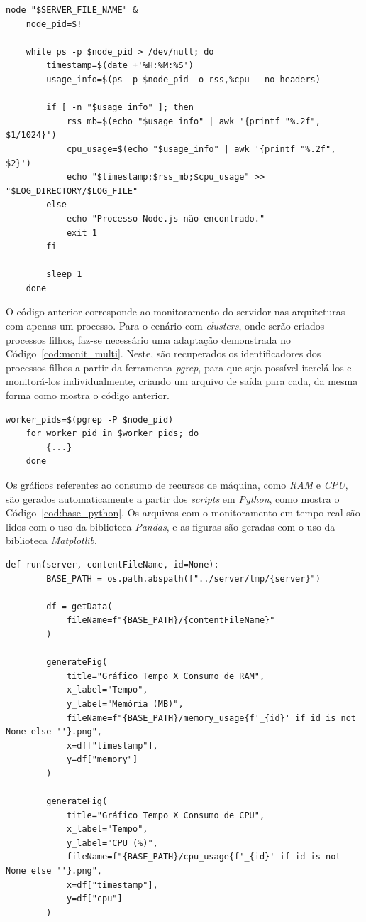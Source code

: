 \documentclass[12pt]{article}
\begin{document}
\begin{lstlisting}[caption={\textit{Script} para monitrar processos \textit{single thread}}, label=cod:monit_single]
	node "$SERVER_FILE_NAME" &
	node_pid=$!

	while ps -p $node_pid > /dev/null; do
		timestamp=$(date +'%H:%M:%S')
		usage_info=$(ps -p $node_pid -o rss,%cpu --no-headers)

		if [ -n "$usage_info" ]; then
			rss_mb=$(echo "$usage_info" | awk '{printf "%.2f", $1/1024}')
			cpu_usage=$(echo "$usage_info" | awk '{printf "%.2f", $2}')
			echo "$timestamp;$rss_mb;$cpu_usage" >> "$LOG_DIRECTORY/$LOG_FILE"
		else
			echo "Processo Node.js não encontrado."
			exit 1
		fi

		sleep 1
	done
\end{lstlisting}

O código anterior corresponde ao monitoramento do servidor nas arquiteturas com apenas um processo. Para o cenário
com \textit{clusters}, onde serão criados processos filhos, faz-se necessário uma adaptação 
demonstrada no Código~\ref{cod:monit_multi}. Neste, são recuperados os identificadores dos processos filhos 
a partir da ferramenta \textit{pgrep}, para que seja possível iterelá-los e monitorá-los individualmente, 
criando um arquivo de saída para cada, da mesma forma como mostra o código anterior.

\begin{lstlisting}[caption={\textit{Script} para monitrar processos \textit{multi thread}}, label=cod:monit_multi]
	worker_pids=$(pgrep -P $node_pid)
	for worker_pid in $worker_pids; do
		{...}
	done
\end{lstlisting}

Os gráficos referentes ao consumo de recursos de máquina, como \textit{RAM} e \textit{CPU}, são
gerados automaticamente a partir dos \textit{scripts} em \textit{Python}, como mostra o Código~\ref{cod:base_python}.
Os arquivos com o monitoramento em tempo real são lidos com o uso da biblioteca \textit{Pandas}, e
as figuras são geradas com o uso da biblioteca \textit{Matplotlib}.

\begin{lstlisting}[caption={\textit{Script} base em \textit{Python} para geração de gráficos.}, label=cod:base_python]
	def run(server, contentFileName, id=None):
		BASE_PATH = os.path.abspath(f"../server/tmp/{server}")

		df = getData(
			fileName=f"{BASE_PATH}/{contentFileName}"
		)

		generateFig(
			title="Gráfico Tempo X Consumo de RAM",
			x_label="Tempo",
			y_label="Memória (MB)",
			fileName=f"{BASE_PATH}/memory_usage{f'_{id}' if id is not None else ''}.png",
			x=df["timestamp"],
			y=df["memory"]
		)

		generateFig(
			title="Gráfico Tempo X Consumo de CPU",
			x_label="Tempo",
			y_label="CPU (%)",
			fileName=f"{BASE_PATH}/cpu_usage{f'_{id}' if id is not None else ''}.png",
			x=df["timestamp"],
			y=df["cpu"]
		)
\end{lstlisting}
\end{document}
